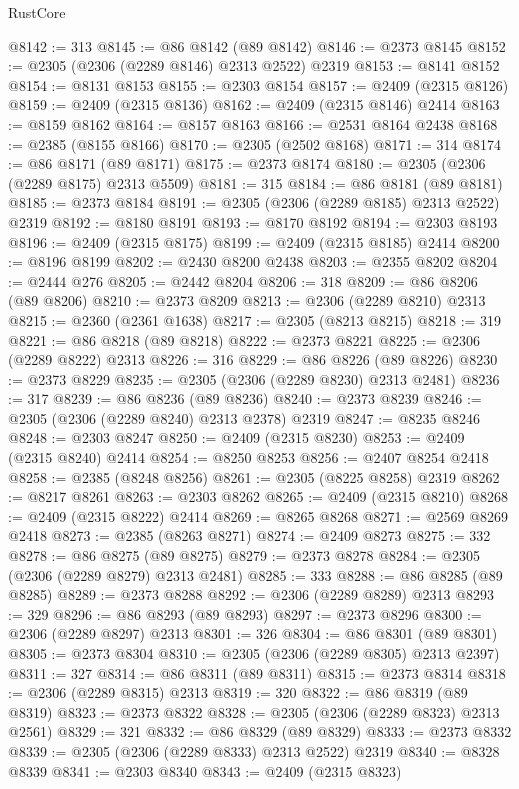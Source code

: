 \begin{lexlean}{RustCore}
\begin{coremodule}
@8142 := 313
@8145 := @86 @8142 (@89 @8142)
@8146 := @2373 @8145
@8152 := @2305 (@2306 (@2289 @8146) @2313 @2522) @2319
@8153 := @8141 @8152
@8154 := @8131 @8153
@8155 := @2303 @8154
@8157 := @2409 (@2315 @8126)
@8159 := @2409 (@2315 @8136)
@8162 := @2409 (@2315 @8146) @2414
@8163 := @8159 @8162
@8164 := @8157 @8163
@8166 := @2531 @8164 @2438
@8168 := @2385 (@8155 @8166)
@8170 := @2305 (@2502 @8168)
@8171 := 314
@8174 := @86 @8171 (@89 @8171)
@8175 := @2373 @8174
@8180 := @2305 (@2306 (@2289 @8175) @2313 @5509)
@8181 := 315
@8184 := @86 @8181 (@89 @8181)
@8185 := @2373 @8184
@8191 := @2305 (@2306 (@2289 @8185) @2313 @2522) @2319
@8192 := @8180 @8191
@8193 := @8170 @8192
@8194 := @2303 @8193
@8196 := @2409 (@2315 @8175)
@8199 := @2409 (@2315 @8185) @2414
@8200 := @8196 @8199
@8202 := @2430 @8200 @2438
@8203 := @2355 @8202
@8204 := @2444 @276
@8205 := @2442 @8204
@8206 := 318
@8209 := @86 @8206 (@89 @8206)
@8210 := @2373 @8209
@8213 := @2306 (@2289 @8210) @2313
@8215 := @2360 (@2361 @1638)
@8217 := @2305 (@8213 @8215)
@8218 := 319
@8221 := @86 @8218 (@89 @8218)
@8222 := @2373 @8221
@8225 := @2306 (@2289 @8222) @2313
@8226 := 316
@8229 := @86 @8226 (@89 @8226)
@8230 := @2373 @8229
@8235 := @2305 (@2306 (@2289 @8230) @2313 @2481)
@8236 := 317
@8239 := @86 @8236 (@89 @8236)
@8240 := @2373 @8239
@8246 := @2305 (@2306 (@2289 @8240) @2313 @2378) @2319
@8247 := @8235 @8246
@8248 := @2303 @8247
@8250 := @2409 (@2315 @8230)
@8253 := @2409 (@2315 @8240) @2414
@8254 := @8250 @8253
@8256 := @2407 @8254 @2418
@8258 := @2385 (@8248 @8256)
@8261 := @2305 (@8225 @8258) @2319
@8262 := @8217 @8261
@8263 := @2303 @8262
@8265 := @2409 (@2315 @8210)
@8268 := @2409 (@2315 @8222) @2414
@8269 := @8265 @8268
@8271 := @2569 @8269 @2418
@8273 := @2385 (@8263 @8271)
@8274 := @2409 @8273
@8275 := 332
@8278 := @86 @8275 (@89 @8275)
@8279 := @2373 @8278
@8284 := @2305 (@2306 (@2289 @8279) @2313 @2481)
@8285 := 333
@8288 := @86 @8285 (@89 @8285)
@8289 := @2373 @8288
@8292 := @2306 (@2289 @8289) @2313
@8293 := 329
@8296 := @86 @8293 (@89 @8293)
@8297 := @2373 @8296
@8300 := @2306 (@2289 @8297) @2313
@8301 := 326
@8304 := @86 @8301 (@89 @8301)
@8305 := @2373 @8304
@8310 := @2305 (@2306 (@2289 @8305) @2313 @2397)
@8311 := 327
@8314 := @86 @8311 (@89 @8311)
@8315 := @2373 @8314
@8318 := @2306 (@2289 @8315) @2313
@8319 := 320
@8322 := @86 @8319 (@89 @8319)
@8323 := @2373 @8322
@8328 := @2305 (@2306 (@2289 @8323) @2313 @2561)
@8329 := 321
@8332 := @86 @8329 (@89 @8329)
@8333 := @2373 @8332
@8339 := @2305 (@2306 (@2289 @8333) @2313 @2522) @2319
@8340 := @8328 @8339
@8341 := @2303 @8340
@8343 := @2409 (@2315 @8323)

\end{coremodule}
\end{lexlean}
